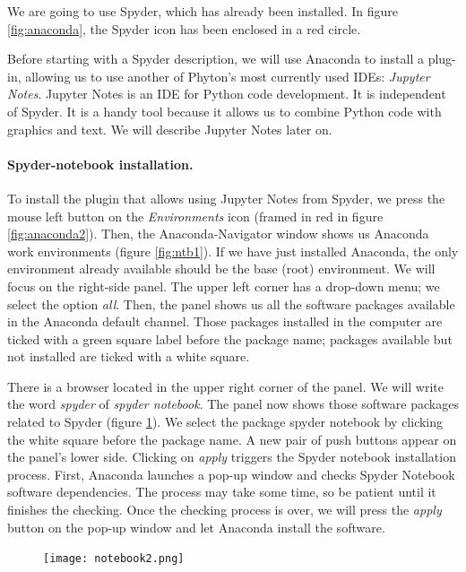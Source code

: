 \begin{paracol}{2}
 We are going to use Spyder, which has already been installed. In figure \ref{fig:anaconda}, the Spyder icon has been enclosed in a red circle.

 Before starting with a Spyder description, we will use Anaconda to install a plug-in, allowing us to use another of Phyton's most currently used IDEs: \emph{Jupyter Notes}. Jupyter Notes is an IDE for Python code development.  It is independent of Spyder. It is a handy tool because it allows us to combine Python code with graphics and text. We will describe Jupyter Notes later on.

 \paragraph{Spyder-notebook installation.} To install the plugin that allows using Jupyter Notes from Spyder, we press the mouse left button on the \emph{Environments} icon (framed in red in figure \ref{fig:anaconda2}). Then, the Anaconda-Navigator window shows us Anaconda work environments (figure \ref{fig:ntb1}). If we have just installed Anaconda, the only environment already available should be the base (root) environment. We will focus on the right-side panel. The upper left corner has a drop-down menu; we select the option \emph{all}. Then, the panel shows us all the software packages available in the Anaconda default channel. Those packages installed in the computer are ticked with a green square label before the package name; packages available but not installed are ticked with a white square.

 There is a browser located in the upper right corner of the panel. We will write the word \emph{spyder} of \emph{spyder notebook}. The panel now shows those software packages related to Spyder (figure \ref{fig:ntb2}). We select the package spyder notebook by clicking the white square before the package name. A new pair of push buttons appear on the panel's lower side. Clicking on \emph{apply} triggers the Spyder notebook installation process. First, Anaconda launches a pop-up window and checks Spyder Notebook software dependencies. The process may take some time, so be patient until it finishes the checking.  Once the checking process is over, we will press the \emph{apply} button on the pop-up window and let Anaconda install the software.
 
\end{paracol}
 
\begin{figure}
\centering
    \texttt{[image: notebook2.png]}
    \label{fig:ntb2}

\end{figure}

